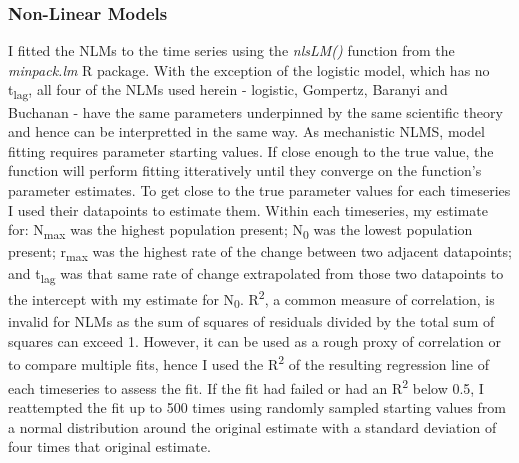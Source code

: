 \documentclass[11pt]{article}
\begin{document}
\subsubsection{Non-Linear Models}
I fitted the NLMs to the time series using the \textit{nlsLM()} function from the \textit{minpack.lm} R package. With the exception of the logistic model, which has no t\textsubscript{lag}, all four of the NLMs used herein - logistic, Gompertz, Baranyi and Buchanan - have the same parameters underpinned by the same scientific theory and hence can be interpretted in the same way.\parencite{Odenbaugh2006}
As mechanistic NLMS, model fitting requires parameter starting values. If close enough to the true value, the function will perform fitting itteratively until they converge on the function's parameter estimates. To get close to the true parameter values for each timeseries I used their datapoints to estimate them. Within each timeseries, my estimate for: N\textsubscript{max} was the highest population present; N\textsubscript{0} was the lowest population present; r\textsubscript{max} was the highest rate of the change between two adjacent datapoints; and t\textsubscript{lag} was that same rate of change extrapolated from those two datapoints to the intercept with my estimate for N\textsubscript{0}.\parencite{Micha2011}
R\textsuperscript{2}, a common measure of correlation, is invalid for NLMs as the sum of squares of residuals divided by the total sum of squares can exceed 1. However, it can be used as a rough proxy of correlation or to compare multiple fits, hence I used the R\textsuperscript{2} of the resulting regression line of each timeseries to assess the fit. If the fit had failed or had an R\textsuperscript{2} below 0.5, I reattempted the fit up to 500 times using randomly sampled starting values from a normal distribution around the original estimate with a standard deviation of four times that original estimate.
\end{document}
